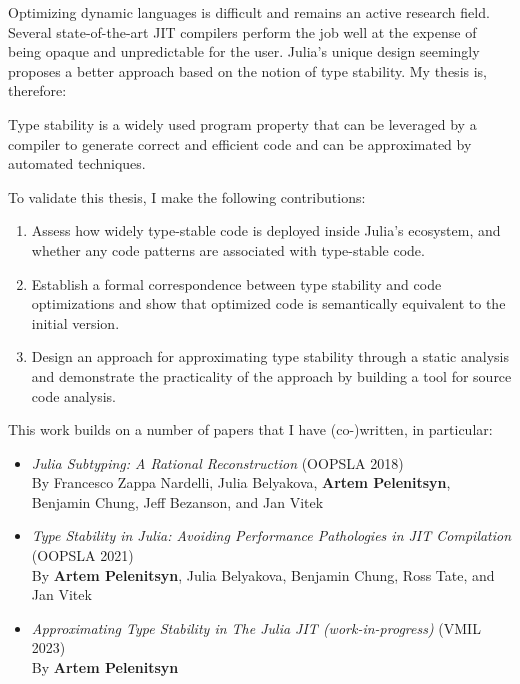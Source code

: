 Optimizing dynamic languages is difficult and remains an active research field.
Several state-of-the-art JIT compilers perform the job well at the expense of being
opaque and unpredictable for the user.
Julia's unique design seemingly proposes a better approach based on the notion
of type stability. My thesis is, therefore:

\begin{itquote}
Type stability
is a widely used program property that can be leveraged by a compiler to generate
correct and efficient code
and can be approximated by automated techniques.
\end{itquote}

To validate this thesis, I make the following contributions:
\begin{enumerate}

  \item
  Assess how widely type-stable code is deployed inside Julia's ecosystem, and
  whether any code patterns are associated with type-stable code.

  \item
  Establish a formal correspondence between type stability and code optimizations and
  show that optimized code is semantically equivalent to the initial version.

  \item
  Design an approach for approximating type stability through a static analysis and
  demonstrate the practicality of the approach by building a tool for source code analysis.
\end{enumerate}


This work builds on a number of papers that I have (co-)written, in particular:
\begin{itemize}
  \item \emph{Julia Subtyping: A Rational Reconstruction} (OOPSLA 2018)\\
  By Francesco Zappa Nardelli, Julia Belyakova, \textbf{Artem Pelenitsyn},
  Benjamin Chung, Jeff Bezanson, and Jan Vitek~\cite{oopsla18b}

  \item \emph{Type Stability in Julia: Avoiding Performance Pathologies in JIT
  Compilation} (OOPSLA 2021)\\
  By \textbf{Artem Pelenitsyn}, Julia Belyakova, Benjamin Chung, Ross Tate, and Jan
  Vitek~\cite{Pelenitsyn21}

  \item \emph{Approximating Type Stability in The Julia JIT (work-in-progress)} (VMIL 2023)\\
  By \textbf{Artem Pelenitsyn}~\cite{Pelenitsyn23}
\end{itemize}
